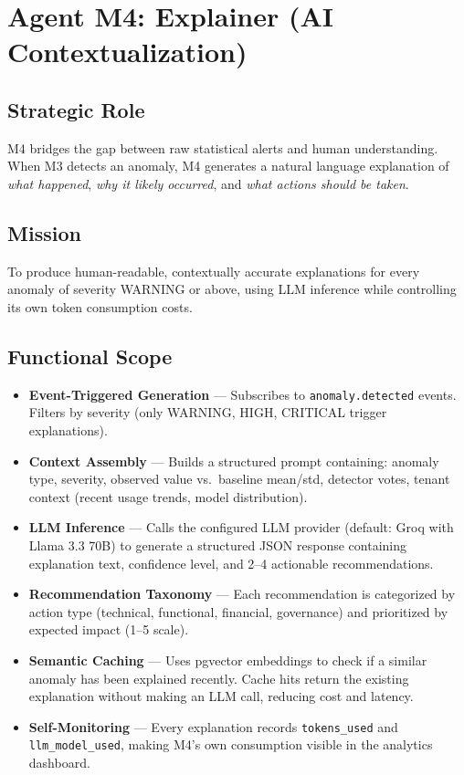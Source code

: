 \documentclass[12pt,a4paper,twoside]{report}
\begin{document}
\section{Agent M4: Explainer (AI Contextualization)}

\subsection{Strategic Role}
M4 bridges the gap between raw statistical alerts and human understanding. When M3 detects an anomaly, M4 generates a natural language explanation of \textit{what happened}, \textit{why it likely occurred}, and \textit{what actions should be taken}.

\subsection{Mission}
To produce human-readable, contextually accurate explanations for every anomaly of severity WARNING or above, using LLM inference while controlling its own token consumption costs.

\subsection{Functional Scope}

\begin{itemize}
  \item \textbf{Event-Triggered Generation} — Subscribes to \texttt{anomaly.detected} events. Filters by severity (only WARNING, HIGH, CRITICAL trigger explanations).

  \item \textbf{Context Assembly} — Builds a structured prompt containing: anomaly type, severity, observed value vs.\ baseline mean/std, detector votes, tenant context (recent usage trends, model distribution).

  \item \textbf{LLM Inference} — Calls the configured LLM provider (default: Groq with Llama 3.3 70B) to generate a structured JSON response containing explanation text, confidence level, and 2--4 actionable recommendations.

  \item \textbf{Recommendation Taxonomy} — Each recommendation is categorized by action type (technical, functional, financial, governance) and prioritized by expected impact (1--5 scale).

  \item \textbf{Semantic Caching} — Uses pgvector embeddings to check if a similar anomaly has been explained recently. Cache hits return the existing explanation without making an LLM call, reducing cost and latency.

  \item \textbf{Self-Monitoring} — Every explanation records \texttt{tokens\_used} and \texttt{llm\_model\_used}, making M4's own consumption visible in the analytics dashboard.
\end{itemize}
\end{document}
